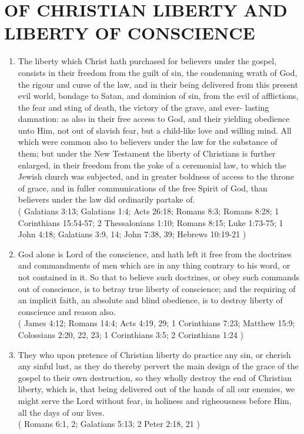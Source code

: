 \documentclass[12pt,a4paper]{book}
\begin{document}
\chapter{OF CHRISTIAN LIBERTY AND LIBERTY OF CONSCIENCE}
\label{ch-lib}
\begin{enumerate}
\item The liberty which Christ hath purchased for believers under the gospel, consists in their freedom from the guilt of sin, the condemning wrath of God, the rigour and curse of the law, and in their being delivered from this present evil world, bondage to Satan, and dominion of sin, from the evil of afflictions, the fear and sting of death, the victory of the grave, and ever- lasting damnation: as also in their free access to God, and their yielding obedience unto Him, not out of slavish fear, but a child-like love and willing mind.
All which were common also to believers under the law for the substance of them; but under the New Testament the liberty of Christians is further enlarged, in their freedom from the yoke of a ceremonial law, to which the Jewish church was subjected, and in greater boldness of access to the throne of grace, and in fuller communications of the free Spirit of God, than believers under the law did ordinarily partake of.\\
( Galatians 3:13; Galatians 1:4; Acts 26:18; Romans 8:3; Romans 8:28; 1 Corinthians 15:54-57; 2 Thessalonians 1:10; Romans 8:15; Luke 1:73-75; 1 John 4:18; Galatians 3:9, 14; John 7:38, 39; Hebrews 10:19-21 )
\item God alone is Lord of the conscience, and hath left it free from the doctrines and commandments of men which are in any thing contrary to his word, or not contained in it. So that to believe such doctrines, or obey such commands out of conscience, is to betray true liberty of conscience; and the requiring of an implicit faith, an absolute and blind obedience, is to destroy liberty of conscience and reason also.\\
( James 4:12; Romans 14:4; Acts 4:19, 29; 1 Corinthians 7:23; Matthew 15:9; Colossians 2:20, 22, 23; 1 Corinthians 3:5; 2 Corinthians 1:24 )
\item They who upon pretence of Christian liberty do practice any sin, or cherish any sinful lust, as they do thereby pervert the main design of the grace of the gospel to their own destruction, so they wholly destroy the end of Christian liberty, which is, that being delivered out of the hands of all our enemies, we might serve the Lord without fear, in holiness and righeousness before Him, all the days of our lives.\\
( Romans 6:1, 2; Galatians 5:13; 2 Peter 2:18, 21 )
\end{enumerate}
\end{document}
